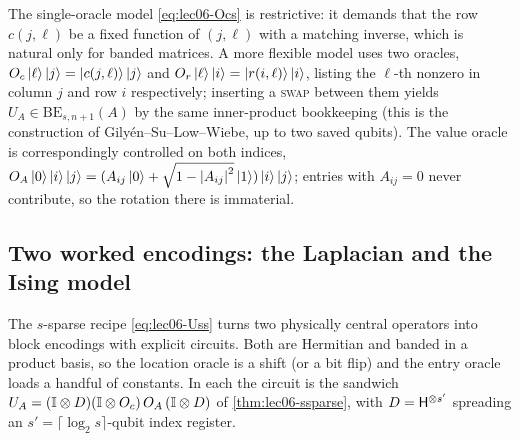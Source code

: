 \begin{remark}
\label{rem:lec06-genloc}
The single-oracle model \eqref{eq:lec06-Ocs} is restrictive: it demands that the row
$c(j,\ell)$ be a fixed function of $(j,\ell)$ with a matching inverse, which is
natural only for banded matrices. A more flexible model uses two oracles,
$O_c\ket{\ell}\ket{j}=\ket{c(j,\ell)}\ket{j}$ and
$O_r\ket{\ell}\ket{i}=\ket{r(i,\ell)}\ket{i}$, listing the $\ell$-th nonzero in
column $j$ and row $i$ respectively; inserting a \textsc{swap} between them yields
$U_A\in\mathrm{BE}_{s,n+1}(A)$ by the same inner-product bookkeeping (this is the
construction of Gily\'en--Su--Low--Wiebe, up to two saved qubits). The value oracle
is correspondingly controlled on both indices,
$O_A\ket{0}\ket{i}\ket{j}=(A_{ij}\ket{0}+\sqrt{1-\left\lvert A_{ij} \right\rvert^2}\ket{1})\ket{i}
\ket{j}$; entries with $A_{ij}=0$ never contribute, so the rotation there is
immaterial.
\end{remark}

\subsection*{Two worked encodings: the Laplacian and the Ising model}

The $s$-sparse recipe \eqref{eq:lec06-Uss} turns two physically central operators into
block encodings with explicit circuits. Both are Hermitian and banded in a product
basis, so the location oracle is a shift (or a bit flip) and the entry oracle loads a
handful of constants. In each the circuit is the sandwich
$U_A=(\mathbb{I}\otimes D)(\mathbb{I}\otimes O_c)\,O_A\,(\mathbb{I}\otimes D)$ of
\cref{thm:lec06-ssparse}, with $D=\mathsf{H}^{\otimes s'}$ spreading an
$s'=\lceil\log_2 s\rceil$-qubit index register.

